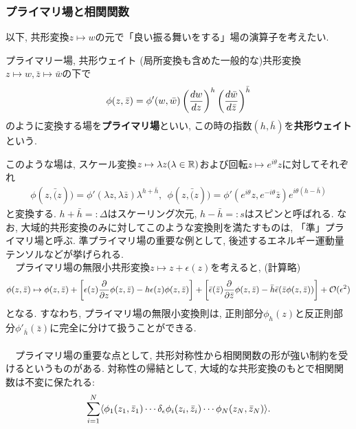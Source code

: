 \subsubsection{プライマリ場と相関関数}
以下, 共形変換$z\mapsto w$の元で「良い振る舞いをする」場の演算子を考えたい. 
\begin{definition}{プライマリー場, 共形ウェイト}
    (局所変換も含めた一般的な)共形変換$z\mapsto w, \bar{z}\mapsto \bar{w}$の下で
    \begin{align}
        \phi(z, \bar{z}) = \phi'(w, \bar{w})\left({\frac{dw}{dz}}\right)^h \left({\frac{d\bar{w}}{d\bar{z}}}\right)^{\bar{h}}
    \end{align}
    のように変換する場を\textbf{プライマリ場}といい, この時の指数$(h, \bar{h})$を\textbf{共形ウェイト}という. 
\end{definition}
このような場は, スケール変換$z\mapsto \lambda z(\lambda\in \mathbb{R})$および回転$z\mapsto e^{i\theta}z$に対してそれぞれ
\begin{align}
    \phi(z, \bar(z))= \phi'(\lambda z, \lambda\bar{z})\lambda^{h+\bar{h}}, ~~
    \phi(z, \bar(z))= \phi'(e^{i\theta}z, e^{-i\theta}\bar{z})e^{i\theta(h-\bar{h})}
\end{align}
と変換する. $h+\bar{h}=: \Delta$はスケーリング次元, $h-\bar{h}=: s$はスピンと呼ばれる. 
なお, 大域的共形変換のみに対してこのような変換則を満たすものは, 「準」プライマリ場と呼ぶ. 
準プライマリ場の重要な例として, 後述するエネルギー運動量テンソルなどが挙げられる. \\
　プライマリ場の無限小共形変換$z\mapsto z + \epsilon(z)$を考えると, (計算略)
\begin{align}
    \phi (z, \bar{z})\mapsto 
    \phi (z, \bar{z}) + \left[{\epsilon(z)\frac{\partial}{\partial z}\phi(z, \bar{z})-h\epsilon(z)\phi(z, \bar{z})}\right]
    +\left[{\bar{\epsilon}(\bar{z})\frac{\partial}{\partial \bar{z}}\phi(z, \bar{z})-\bar{h}\bar{\epsilon}(\bar{z}\phi(z, \bar{z}))}\right]
    +\mathcal{O}(\epsilon^2)
\end{align}
となる. すなわち, プライマリ場の無限小変換則は, 
正則部分$\phi_h(z)$と反正則部分$\phi'_{\bar{h}}(\bar{z})$に完全に分けて扱うことができる. \\
\\
　プライマリ場の重要な点として, 共形対称性から相関関数の形が強い制約を受けるというものがある. 
対称性の帰結として, 大域的な共形変換のもとで相関関数は不変に保たれる: 
\begin{align}
    \sum_{i=1}^{N}\langle{\phi_1(z_1, \bar{z}_1)\cdots \delta_\epsilon\phi_i(z_i, \bar{z}_i)\cdots \phi_N(z_N, \bar{z}_N)}\rangle
    \label{Csym}. 
\end{align}
